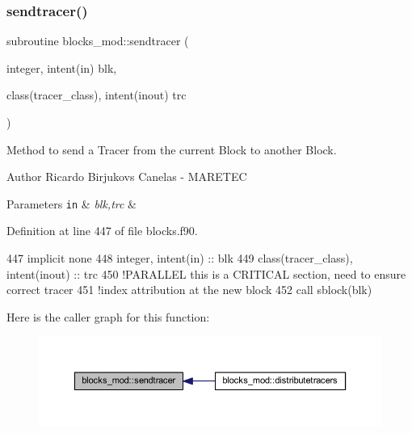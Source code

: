 \subsubsection{\texorpdfstring{sendtracer()}{sendtracer()}}
{\footnotesize\ttfamily subroutine blocks\+\_\+mod\+::sendtracer (\begin{DoxyParamCaption}\item[{integer, intent(in)}]{blk,  }\item[{class(tracer\+\_\+class), intent(inout)}]{trc }\end{DoxyParamCaption})\hspace{0.3cm}{\ttfamily [private]}}



Method to send a Tracer from the current Block to another Block. 

\begin{DoxyAuthor}{Author}
Ricardo Birjukovs Canelas -\/ M\+A\+R\+E\+T\+EC 
\end{DoxyAuthor}

\begin{DoxyParams}[1]{Parameters}
\mbox{\tt in}  & {\em blk,trc} & \\
\hline
\end{DoxyParams}


Definition at line 447 of file blocks.\+f90.


\begin{DoxyCode}
447     \textcolor{keywordtype}{implicit none}
448     \textcolor{keywordtype}{integer}, \textcolor{keywordtype}{intent(in)} :: blk
449     \textcolor{keywordtype}{class}(tracer\_class), \textcolor{keywordtype}{intent(inout)} :: trc
450     \textcolor{comment}{!PARALLEL this is a CRITICAL section, need to ensure correct tracer}
451     \textcolor{comment}{!index attribution at the new block}
452     \textcolor{keyword}{call }sblock(blk)%
\end{DoxyCode}
Here is the caller graph for this function\+:\nopagebreak
\begin{figure}[H]
\begin{center}
\leavevmode
\includegraphics[width=350pt]{namespaceblocks__mod_a5a9992de40470e417ec8e40e688f6a0e_icgraph}
\end{center}
\end{figure}
\mbox{\label{namespaceblocks__mod_a8f5a5d9e6cfd16cfd1b179092a204696}} 

